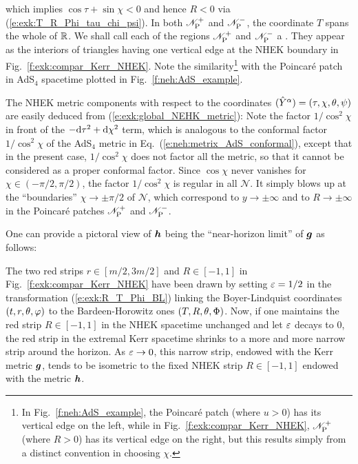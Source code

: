 which implies $\cos\tau + \sin\chi < 0$ and hence $R<0$ via (\ref{e:exk:T_R_Phi_tau_chi_psi}).
In both $\mathscr{N}_{\rm P}^+$
and $\mathscr{N}_{\rm P}^-$, the coordinate $T$ spans the whole of $\mathbb{R}$.
We shall call each of the regions $\mathscr{N}_{\rm P}^+$
and $\mathscr{N}_{\rm P}^-$  a .
They appear as the interiors of triangles having one vertical edge at the NHEK
boundary in Fig.~\ref{f:exk:compar_Kerr_NHEK}. Note the similarity\footnote{In
Fig.~\ref{f:neh:AdS_example}, the Poincaré patch (where $u>0$)
has its vertical edge on the left, while in Fig.~\ref{f:exk:compar_Kerr_NHEK},
$\mathscr{N}_{\rm P}^+$ (where $R>0$) has its vertical edge on the right, but this results simply
from a distinct convention in choosing $\chi$.}
with the Poincaré patch in AdS$_4$ spacetime plotted in Fig.~\ref{f:neh:AdS_example}.

The NHEK metric components with respect to the coordinates
$(\hat{Y}^\alpha)=(\tau,\chi,\theta,\psi)$ are easily deduced from
(\ref{e:exk:global_NEHK_metric}):
\be
\ee
Note the factor $1/\cos^2\chi$ in front of the
$- \mathrm{d} \tau^2 + \mathrm{d} \chi^2$ term, which is analogous to the conformal factor
$1/\cos^2\chi$ of the AdS$_4$ metric in Eq.~(\ref{e:neh:metrix_AdS_conformal}),
except that in the present case, $1/\cos^2\chi$ does not factor all the
metric, so that it cannot be considered as a proper conformal factor. Since $\cos\chi$ never vanishes
for $\chi\in(-\pi/2, \pi/2)$,
the factor $1/\cos^2\chi$ is regular in all $\mathscr{N}$. It simply blows up
at the ``boundaries'' $\chi\to \pm \pi/2$ of $\mathscr{N}$,
which correspond to $y\to \pm\infty$ and to $R\to \pm\infty$ in the Poincaré patches
$\mathscr{N}_{\rm P}^+$ and $\mathscr{N}_{\rm P}^-$.

One can provide a pictoral view of $\bm{h}$ being the ``near-horizon limit'' of $\bm{g}$ as follows:

\begin{greybox}
The two red strips $r\in[m/2, 3m/2]$ and $R\in[-1, 1]$
in Fig.~\ref{f:exk:compar_Kerr_NHEK} have been drawn by setting
$\varepsilon=1/2$ in the transformation (\ref{e:exk:R_T_Phi_BL}) linking the Boyer-Lindquist coordinates
$(t,r,\theta,\varphi)$ to the Bardeen-Horowitz ones $(T,R,\theta,\Phi)$. Now, if one maintains
the red strip $R\in[-1, 1]$ in the NHEK spacetime unchanged and let $\varepsilon$ decays to $0$,
the red strip in the extremal Kerr spacetime  shrinks to a more and more narrow strip
around the horizon. As $\varepsilon\to 0$, this narrow strip, endowed with the Kerr metric $\bm{g}$, tends
to be isometric to the fixed NHEK strip $R\in[-1, 1]$ endowed with the metric $\bm{h}$.
\end{greybox}


